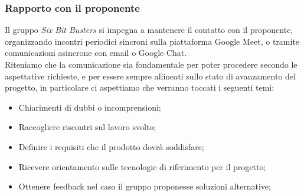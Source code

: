 \subsubsection{Rapporto con il proponente}
Il gruppo \textit{Six Bit Busters} si impegna a mantenere il contatto con il proponente, 
organizzando incontri periodici sincroni sulla piattaforma Google Meet, o tramite comunicazioni 
asincrone con email o Google Chat.\\
Riteniamo che la comunicazione sia fondamentale per poter procedere secondo le aspettative 
richieste, e per essere sempre allineati sullo stato di avanzamento del progetto, in particolare 
ci aspettiamo che verranno toccati i seguenti temi:
\begin{itemize}
    \item Chiarimenti di dubbi o incomprensioni;
    \item Raccogliere riscontri sul lavoro svolto;
    \item Definire i requisiti che il prodotto dovrà soddisfare;
    \item Ricevere orientamento sulle tecnologie di riferimento per il progetto;
    \item Ottenere feedback nel caso il gruppo proponesse soluzioni alternative;  
\end{itemize}

